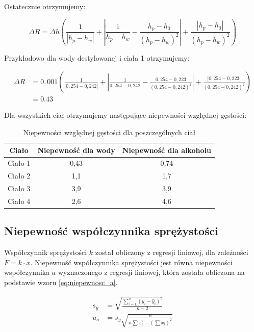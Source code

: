\documentclass[a4paper,12pt]{article}
\begin{document}
Ostatecznie otrzymujemy:

\begin{equation}
    \Delta R = \Delta h \left(
    \frac{1}{|h_p - h_w|}
    + \left| \frac{1}{h_p - h_w} - \frac{h_p - h_0}{(h_p - h_w)^2} \right|
    + \frac{|h_p - h_0|}{(h_p - h_w)^2}
    \right)
\end{equation}

Przykładowo dla wody destylowanej i ciała 1 otrzymujemy:

\begin{align*}
    \Delta R & = 0{,}001 \left(
    \frac{1}{|0{,}254 - 0{,}242|}
    + \left| \frac{1}{0{,}254 - 0{,}242} - \frac{0{,}254 - 0{,}223}{(0{,}254 - 0{,}242)^2} \right|
    + \frac{|0{,}254 - 0{,}223|}{(0{,}254 - 0{,}242)^2}
    \right)                     \\
             & = 0.43
\end{align*}

Dla wszystkich ciał otrzymujemy następujące niepewności względnej gęstości:
\begin{table}[H]
    \centering
    \begin{tabular}{|c|c|c|}
        \hline
        \textbf{Ciało} & \textbf{Niepewność dla wody} & \textbf{Niepewność dla alkoholu} \\
        \hline
        Ciało 1 & 0{,}43 & 0{,}74 \\
        \hline
        Ciało 2 & 1{,}1 & 1{,}7 \\
        \hline
        Ciało 3 & 3{,}9 & 3{,}9 \\
        \hline
        Ciało 4 & 2{,}6 & 4{,}6 \\
        \hline
    \end{tabular}
    \caption{Niepewności względnej gęstości dla poszczególnych ciał}
    \label{tab:niepewnosci}
\end{table}

\subsection{Niepewność współczynnika sprężystości}

Współczynnik sprężystości $k$ został obliczony z regresji liniowej, dla zależności $F = k \cdot x$. Niepewność współczynnika sprężystości jest równa niepewności współczynnika $a$ wyznaczonego z regresji liniowej, która została obliczona na podstawie wzoru \eqref{eq:niepewnosc_a}.


\begin{align}
    \label{eq:niepewnosc_a}
    s_y & = \sqrt{\frac{\sum_{i=1}^{n} (y_i - \hat{y}_i)^2}{n-2}}         \\
    u_a & = s_y \sqrt{\frac{n}{n \sum x_i^2 - \left( \sum x_i \right)^2}}
\end{align}
\end{document}
